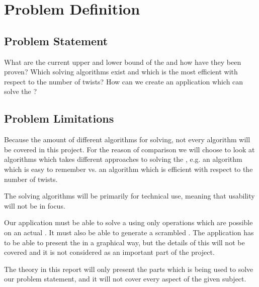 \chapter{Problem Definition}
\section{Problem Statement}
What are the current upper and lower bound of the \rubik{} and how have they been proven? \newline\newline
Which solving algorithms exist and which is the most efficient with respect to the number of twists? \newline\newline
How can we create an application which can solve the \rubik{}?

\section{Problem Limitations}
\label{sec:problemLimitations}
Because the amount of different algorithms for \rubik{} solving, not every algorithm will be covered in this project.
For the reason of comparison we will choose to look at algorithms which takes different approaches to solving the \rubik{}, e.g. an algorithm which is easy to remember vs. an algorithm which is efficient with respect to the number of twists.

The \rubik{} solving algorithms will be primarily for technical use, meaning that usability will not be in focus.

Our application must be able to solve a \rubik{} using only operations which are possible on an actual \rubik{}.
It must also be able to generate a scrambled \rubik{}.
The application has to be able to present the \rubik{} in a graphical way, but the details of this will not be covered and it is not considered as an important part of the project.

The theory in this report will only present the parts which is being used to solve our problem statement, and it will not cover every aspect of the given subject.